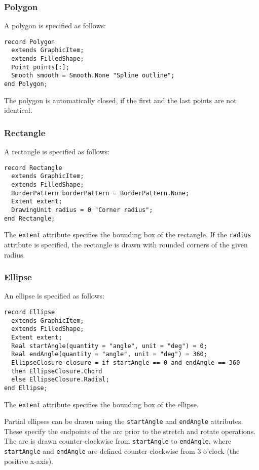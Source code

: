 \subsubsection{Polygon}\label{polygon}

A polygon is specified as follows:
\begin{lstlisting}[language=modelica]
record Polygon
  extends GraphicItem;
  extends FilledShape;
  Point points[:];
  Smooth smooth = Smooth.None "Spline outline";
end Polygon;
\end{lstlisting}%
The polygon is automatically closed, if the first and the last points are not identical.

\subsubsection{Rectangle}\label{rectangle}

A rectangle is specified as follows:
\begin{lstlisting}[language=modelica]
record Rectangle
  extends GraphicItem;
  extends FilledShape;
  BorderPattern borderPattern = BorderPattern.None;
  Extent extent;
  DrawingUnit radius = 0 "Corner radius";
end Rectangle;
\end{lstlisting}%
The \lstinline!extent! attribute specifies the bounding box of the rectangle.
If the \lstinline!radius! attribute is specified, the rectangle is drawn with rounded corners of the given radius.

\subsubsection{Ellipse}\label{ellipse}

An ellipse is specified as follows:
\begin{lstlisting}[language=modelica]
record Ellipse
  extends GraphicItem;
  extends FilledShape;
  Extent extent;
  Real startAngle(quantity = "angle", unit = "deg") = 0;
  Real endAngle(quantity = "angle", unit = "deg") = 360;
  EllipseClosure closure = if startAngle == 0 and endAngle == 360
  then EllipseClosure.Chord
  else EllipseClosure.Radial;
end Ellipse;
\end{lstlisting}%
The \lstinline!extent! attribute specifies the bounding box of the ellipse.

Partial ellipses can be drawn using the \lstinline!startAngle! and \lstinline!endAngle! attributes.  These specify the endpoints of the arc prior to the stretch and rotate operations.  The arc is drawn counter-clockwise from \lstinline!startAngle! to \lstinline!endAngle!, where \lstinline!startAngle! and \lstinline!endAngle! are defined counter-clockwise from 3 o'clock (the positive x-axis).

